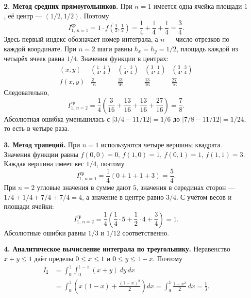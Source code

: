 \documentclass[12pt,a4paper]{article}
\begin{document}
\textbf{2. Метод средних прямоугольников.}
При $n=1$ имеется одна ячейка площади $1$, её центр --- $(1/2,1/2)$.
Поэтому
\[
I_{1,\,n=1}^{\mathrm{ср}}=1\cdot f(\tfrac12,\tfrac12)
=\frac14+\frac14+\frac14=\frac34.
\]
Здесь первый индекс обозначает номер интеграла, а $n$ --- число отрезков
по каждой координате. При $n=2$ шаги равны $h_x=h_y=1/2$,
площадь каждой из четырёх ячеек равна $1/4$. Значения функции в центрах:
\[
\begin{array}{c|cccc}
(x,y)&(\tfrac14,\tfrac14)&(\tfrac14,\tfrac34)&(\tfrac34,\tfrac14)&(\tfrac34,\tfrac34)\\[4pt]
\hline
f(x,y)&\tfrac3{16}&\tfrac{13}{16}&\tfrac{13}{16}&\tfrac{27}{16}
\end{array}
\]
Следовательно,
\[
I_{1,\,n=2}^{\mathrm{ср}}
=\frac14\left(\frac3{16}+\frac{13}{16}+\frac{13}{16}+\frac{27}{16}\right)
=\frac78.
\]
Абсолютная ошибка уменьшилась с $|3/4-11/12|=1/6$
до $|7/8-11/12|=1/24$, то есть в четыре раза.

\textbf{3. Метод трапеций.}
При $n=1$ используются четыре вершины квадрата. Значения функции равны
$f(0,0)=0$, $f(1,0)=1$, $f(0,1)=1$, $f(1,1)=3$.
Каждая вершина имеет вес $1/4$, поэтому
\[
I_{1,\,n=1}^{\mathrm{тр}}=\frac14(0+1+1+3)=\frac54.
\]
При $n=2$ угловые значения в сумме дают $5$, значения в серединах сторон ---
$1/4+1/4+7/4+7/4=4$, а значение в центре равно $3/4$.
С учётом весов и площади ячейки:
\[
I_{1,\,n=2}^{\mathrm{тр}}
=\frac14\left(\frac14\cdot5+\frac12\cdot4+\frac34\right)=1.
\]
Абсолютные ошибки равны $1/3$ и $1/12$ соответственно.

\textbf{4. Аналитическое вычисление интеграла по треугольнику.}
Неравенство $x+y\leq1$ даёт пределы $0\leq x\leq1$ и $0\leq y\leq1-x$.
Поэтому
\[
\begin{aligned}
I_2&=\int_0^1\int_0^{1-x}(x+y)\,dy\,dx\\
&=\int_0^1\left(x(1-x)+\frac{(1-x)^2}{2}\right)dx
=\int_0^1\frac{1-x^2}{2}\,dx=\frac13.
\end{aligned}
\]
\end{document}
